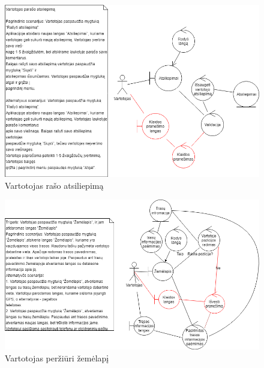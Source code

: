 \documentclass[oneside]{VUMIFPSkursinis}
\begin{document}
			\begin{figure}[h]
    				\centering
    				\includegraphics[width=1\textwidth]{rob12.png}
    				\caption{Vartotojas rašo atsiliepimą}
    				\label{fig:Vartotojas rašo atsiliepimą}
			\end{figure}

			\begin{figure}[h]
    				\centering
    				\includegraphics[width=1\textwidth]{rob13.png}
    				\caption{Vartotojas peržiūri žemėlapį}
    				\label{fig:Vartotojas peržiūri žemėlapį}
			\end{figure}
\end{document}
